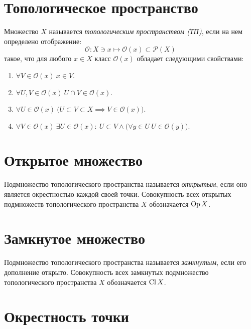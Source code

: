\section{Топологическое пространство}

\begin{definition}
	Множество $X$ называется \emph{топологическим пространством (ТП)}, если на нем определено отображение:
	\[
		\mathcal{O} : X \ni x \mapsto \mathcal{O}(x) \subset \mathscr{P}(X)
	\]
	такое, что для любого $x \in X$ класс $\mathcal{O}(x)$ обладает следующими свойствами:
	\begin{enumerate}
		\item $\forall V \in \mathcal{O}(x) \ x \in V$.
		\item $\forall U,V \in \mathcal{O}(x) \ U \cap V \in \mathcal{O}(x)$.
		\item $\forall U \in \mathcal{O}(x) \ \big(U \subset V \subset X \implies V \in \mathcal{O}(x)\big)$.
		\item $\forall V \in \mathcal{O}(x) \ \exists U \in \mathcal{O}(x): \ U \subset V \land \big(\forall y \in U \ U \in \mathcal{O}(y)\big)$.
	\end{enumerate}
\end{definition}

\section{Открытое множество}

\begin{definition}
	Подмножество топологического пространства называется \emph{открытым}, если оно является окрестностью каждой своей точки. Совокупность всех открытых подмножеств топологического пространства $X$ обозначается $\operatorname{Op} X$.
\end{definition}

\section{Замкнутое множество}

\begin{definition}
	Подмножество топологического пространства называется \emph{замкнутым}, если его дополнение открыто. Совокупность всех замкнутых подмножество топологического пространства $X$ обозначается $\operatorname{Cl} X$.
\end{definition}

\section{Окрестность точки}


